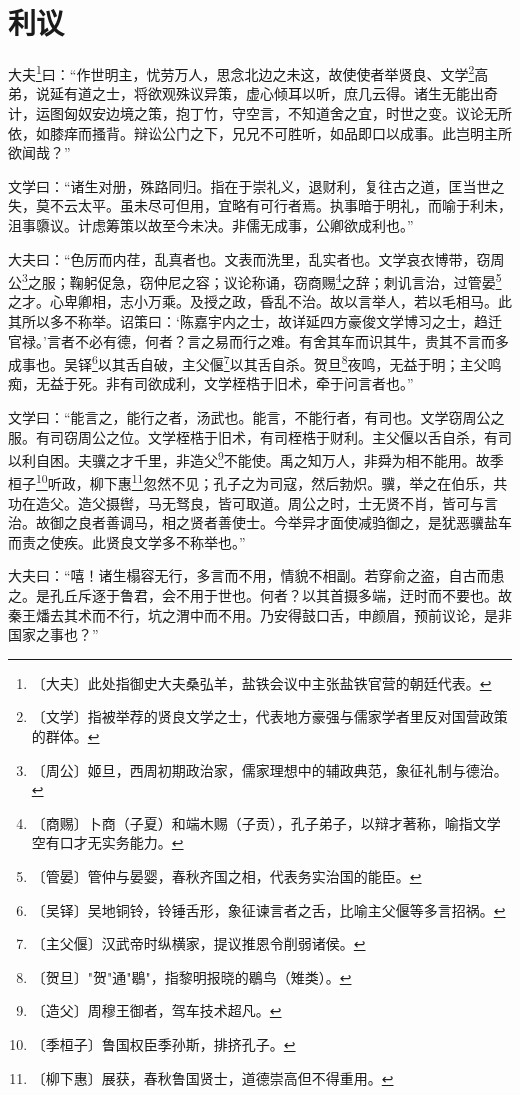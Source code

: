 \documentclass[12pt,UTF-8,openany]{ctexbook}
\begin{document}
\chapter{利议}

\begin{normalsize}
    
    大夫\footnote{〔大夫〕此处指御史大夫桑弘羊，盐铁会议中主张盐铁官营的朝廷代表。}曰：“作世明主，忧劳万人，思念北边之未这，故使使者举贤良、文学\footnote{〔文学〕指被举荐的贤良文学之士，代表地方豪强与儒家学者里反对国营政策的群体。}高弟，说延有道之士，将欲观殊议异策，虚心倾耳以听，庶几云得。诸生无能出奇计，运图匈奴安边境之策，抱丁竹，守空言，不知道舍之宜，时世之变。议论无所依，如膝痒而搔背。辩讼公门之下，兄兄不可胜听，如品即口以成事。此岂明主所欲闻哉？”
    
    文学曰：“诸生对册，殊路同归。指在于崇礼义，退财利，复往古之道，匡当世之失，莫不云太平。虽未尽可但用，宜略有可行者焉。执事暗于明礼，而喻于利未，沮事隳议。计虑筹策以故至今未决。非儒无成事，公卿欲成利也。”
    
    大夫曰：“色厉而内荏，乱真者也。文表而洗里，乱实者也。文学哀衣博带，窃周公\footnote{〔周公〕姬旦，西周初期政治家，儒家理想中的辅政典范，象征礼制与德治。}之服；鞠躬促急，窃仲尼之容；议论称诵，窃商赐\footnote{〔商赐〕卜商（子夏）和端木赐（子贡），孔子弟子，以辩才著称，喻指文学空有口才无实务能力。}之辞；刺讥言治，过管晏\footnote{〔管晏〕管仲与晏婴，春秋齐国之相，代表务实治国的能臣。}之才。心卑卿相，志小万乘。及授之政，昏乱不治。故以言举人，若以毛相马。此其所以多不称举。诏策曰：‘陈嘉宇内之士，故详延四方豪俊文学博习之士，趋迁官禄。’言者不必有德，何者？言之易而行之难。有舍其车而识其牛，贵其不言而多成事也。吴铎\footnote{〔吴铎〕吴地铜铃，铃锤舌形，象征谏言者之舌，比喻主父偃等多言招祸。}以其舌自破，主父偃\footnote{〔主父偃〕汉武帝时纵横家，提议推恩令削弱诸侯。}以其舌自杀。贺旦\footnote{〔贺旦〕"贺"通"鶡"，指黎明报晓的鶡鸟（雉类）。}夜鸣，无益于明；主父鸣痴，无益于死。非有司欲成利，文学桎梏于旧术，牵于问言者也。”
    
    文学曰：“能言之，能行之者，汤武也。能言，不能行者，有司也。文学窃周公之服。有司窃周公之位。文学桎梏于旧术，有司桎梏于财利。主父偃以舌自杀，有司以利自困。夫骥之才千里，非造父\footnote{〔造父〕周穆王御者，驾车技术超凡。}不能使。禹之知万人，非舜为相不能用。故季桓子\footnote{〔季桓子〕鲁国权臣季孙斯，排挤孔子。}听政，柳下惠\footnote{〔柳下惠〕展获，春秋鲁国贤士，道德崇高但不得重用。}忽然不见；孔子之为司寇，然后勃炽。骥，举之在伯乐，共功在造父。造父摄辔，马无驽良，皆可取道。周公之时，士无贤不肖，皆可与言治。故御之良者善调马，相之贤者善使士。今举异才面使减驺御之，是犹恶骥盐车而责之使疾。此贤良文学多不称举也。”
    
    大夫曰：“嘻！诸生榻容无行，多言而不用，情貌不相副。若穿俞之盗，自古而患之。是孔丘斥逐于鲁君，会不用于世也。何者？以其首摄多端，迂时而不要也。故秦王燔去其术而不行，坑之渭中而不用。乃安得鼓口舌，申颜眉，预前议论，是非国家之事也？”
\end{normalsize}
\end{document}
